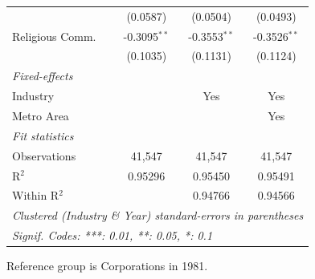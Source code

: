 \documentclass[
  12pt]{article}
\begin{document}
\begin{table}
\begin{minipage}{\linewidth}
\begin{tabular}{lccc}
                     & (0.0587)       & (0.0504)       & (0.0493)\\   
   Religious Comm.   & -0.3095$^{**}$ & -0.3553$^{**}$ & -0.3526$^{**}$\\   
                     & (0.1035)       & (0.1131)       & (0.1124)\\   
   \midrule
   \emph{Fixed-effects}\\
   Industry          &                & Yes            & Yes\\  
   Metro Area        &                &                & Yes\\  
   \midrule
   \emph{Fit statistics}\\
   Observations      & 41,547         & 41,547         & 41,547\\  
   R$^2$             & 0.95296        & 0.95450        & 0.95491\\  
   Within R$^2$      &                & 0.94766        & 0.94566\\  
   \midrule \midrule
   \multicolumn{4}{l}{\emph{Clustered (Industry \& Year) standard-errors in parentheses}}\\
   \multicolumn{4}{l}{\emph{Signif. Codes: ***: 0.01, **: 0.05, *: 0.1}}\\
\end{tabular}

\end{minipage}%
\newline
\begin{minipage}{\linewidth}

\par \raggedright

\end{minipage}%
\newline
\begin{minipage}{\linewidth}

Reference group is Corporations in 1981.

\end{minipage}%
\newline
\begin{minipage}{\linewidth}

\par\endgroup

\end{minipage}%

\end{table}%
\end{document}
